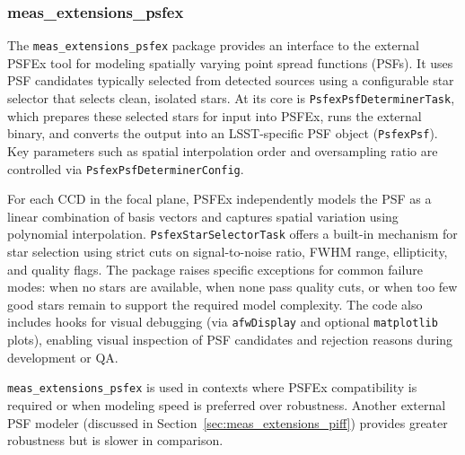 \subsubsection{meas\_extensions\_psfex}\label{sec:meas_extensions_psfex}

The \texttt{meas\_extensions\_psfex} package provides an interface to the external PSFEx tool \citep{2011ASPC..442..435B} for modeling spatially varying point spread functions (PSFs).
It uses PSF candidates typically selected from detected sources using a configurable star selector that selects clean, isolated stars.
At its core is \texttt{PsfexPsfDeterminerTask}, which prepares these selected stars for input into PSFEx, runs the external binary, and converts the output into an LSST-specific PSF object (\texttt{PsfexPsf}).
Key parameters such as spatial interpolation order and oversampling ratio are controlled via \texttt{PsfexPsfDeterminerConfig}.

For each CCD in the focal plane, PSFEx independently models the PSF as a linear combination of basis vectors and captures spatial variation using polynomial interpolation.
\texttt{PsfexStarSelectorTask} offers a built-in mechanism for star selection using strict cuts on signal-to-noise ratio, FWHM range, ellipticity, and quality flags.
The package raises specific exceptions for common failure modes: when no stars are available, when none pass quality cuts, or when too few good stars remain to support the required model complexity.
The code also includes hooks for visual debugging (via \texttt{afwDisplay} and optional \texttt{matplotlib} plots), enabling visual inspection of PSF candidates and rejection reasons during development or QA.

\texttt{meas\_extensions\_psfex} is used in contexts where PSFEx compatibility is required or when modeling speed is preferred over robustness.
Another external PSF modeler (discussed in Section~\ref{sec:meas_extensions_piff}) provides greater robustness but is slower in comparison.
